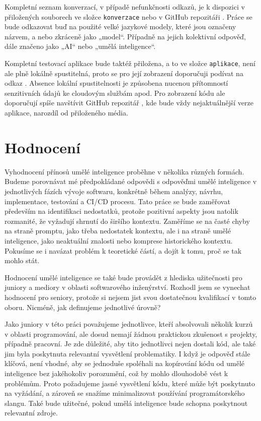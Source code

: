 \documentclass[FM,DP]{tulthesis}
\begin{document}
		Kompletní seznam konverzací, v případě nefunkčnosti odkazů, je k dispozici v přiložených souborech ve složce \verb|konverzace| nebo v GitHub repozitáři \cite{promptsRepo}. Práce se bude odkazovat buď na použité velké jazykové modely, které jsou označeny názvem, a nebo zkráceně jako „model“. Případně na jejich kolektivní odpověď, dále značeno jako „AI“ nebo „umělá inteligence“.
		
		Kompletní testovací aplikace bude taktéž přiložena, a to ve složce \verb|aplikace|, není ale plně lokálně spustitelná, proto se pro její zobrazení doporučuji podívat na odkaz \cite{final_app}. Absence lokální spustitelnosti je způsobena nucenou přítomností senzitivních údajů ke cloudovým službám apod. Pro zobrazení kódu ale doporučují spíše navštívit GitHub repozitář \cite{gh_final_app}, kde bude vždy nejaktuálnější verze aplikace, narozdíl od přiloženého média. 
		
		\section{Hodnocení}
		Vyhodnocení přínosů umělé inteligence proběhne v několika různých formách. Budeme porovnávat mé předpokládané odpovědi s odpověďmi umělé inteligence v jednotlivých fázích vývoje softwaru, konkrétně během analýzy, návrhu, implementace, testování a CI/CD procesu. Tato práce se bude zaměřovat především na identifikaci nedostatků, protože pozitivní aspekty jsou natolik rozmanité, že vyžadují shrnutí do širšího kontextu. Zaměříme se na časté chyby na straně promptu, jako třeba nedostatek kontextu, ale i na straně umělé inteligence, jako neaktuální znalosti nebo komprese historického kontextu. Pokusíme se i navázat problém k teoretické částí, a dojít k tomu, proč se tak mohlo stát.
		
		Hodnocení umělé inteligence se také bude provádět z hlediska užitečnosti pro juniory a mediory v oblasti softwarového inženýrství. Rozhodl jsem se vynechat hodnocení pro seniory, protože si nejsem jist svou dostatečnou kvalifikací v tomto oboru. Nicméně, jak definujeme jednotlivé úrovně?
		
		Jako juniory v této práci považujeme jednotlivce, kteří absolvovali několik kurzů v oblasti programování, ale dosud nemají žádnou praktickou zkušenost s projekty, případně pracovní. Je zde důležité, aby tito jednotlivci nejen dostali kód, ale také jim byla poskytnuta relevantní vysvětlení problematiky. I když je odpověď stále klíčová, není vhodné, aby se jednoduše spoléhali na kopírování kódu od umělé inteligence bez jakéhokoliv porozumění, což by mohlo dlouhodobě vést k problémům. Proto požadujeme jasné vysvětlení kódu, které může být poskytnuto na vyžádání, a zároveň se snažíme minimalizovat používání programátorského slangu. Také bude užitečné, pokud umělá inteligence bude schopna poskytnout relevantní zdroje.
		
\end{document}
